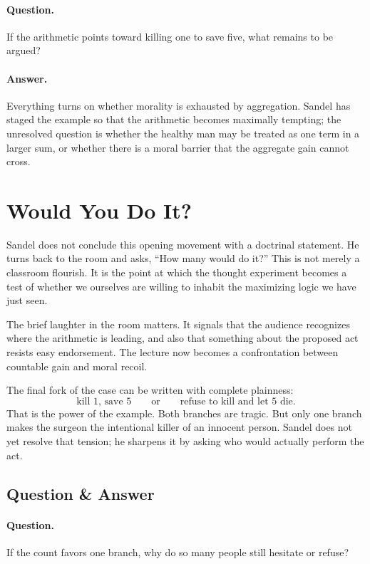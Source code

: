 \paragraph{Question.} If the arithmetic points toward killing one to save five, what remains to be argued?

\paragraph{Answer.} Everything turns on whether morality is exhausted by aggregation. Sandel has staged the example so that the arithmetic becomes maximally tempting; the unresolved question is whether the healthy man may be treated as one term in a larger sum, or whether there is a moral barrier that the aggregate gain cannot cross.

\section{Would You Do It?}

Sandel does not conclude this opening movement with a doctrinal statement. He turns back to the room and asks, ``How many would do it?'' This is not merely a classroom flourish. It is the point at which the thought experiment becomes a test of whether we ourselves are willing to inhabit the maximizing logic we have just seen.

The brief laughter in the room matters. It signals that the audience recognizes where the arithmetic is leading, and also that something about the proposed act resists easy endorsement. The lecture now becomes a confrontation between countable gain and moral recoil.

The final fork of the case can be written with complete plainness:
\begin{equation}
\text{kill }1\text{, save }5
\qquad \text{or} \qquad
\text{refuse to kill and let }5\text{ die}.
\end{equation}
That is the power of the example. Both branches are tragic. But only one branch makes the surgeon the intentional killer of an innocent person. Sandel does not yet resolve that tension; he sharpens it by asking who would actually perform the act.

\subsection{Question \& Answer}

\paragraph{Question.} If the count favors one branch, why do so many people still hesitate or refuse?

